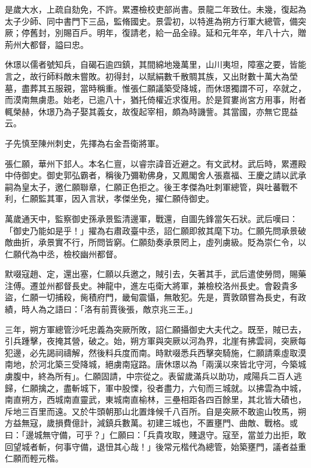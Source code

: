 \begin{pinyinscope}
 是歲大水，上疏自劾免，不許。累遷檢校吏部尚書。景龍二年致仕。未幾，復起為太子少師、同中書門下三品，監脩國史。景雲初，以特進為朔方行軍大總管，備突厥；停舊封，別賜百戶。明年，復請老，給一品全祿。延和元年卒，年八十六，贈荊州大都督，謚曰忠。



 休璟以儒者號知兵，自碣石逾四鎮，其間綿地幾萬里，山川夷坦，障塞之要，皆能言之，故行師料敵未嘗敗。初得封，以賦絹數千散賙其族，又出財數十萬大為塋墓，盡葬其五服親，當時稱重。惟張仁願議築受降城，而休璟獨謂不可，卒就之，而漠南無虜患。始老，已逾八十，猶托倚權近求復用。於是賀婁尚宮方用事，附者輒榮赫，休璟乃為子娶其義女，故復起宰相，頗為時譏訾。其當國，亦無它毘益云。



 子先慎至陳州刺史，先擇為右金吾衛將軍。



 張仁願，華州下邽人。本名仁亶，以睿宗諱音近避之。有文武材。武后時，累遷殿中侍御史。御史郭弘霸者，稱後乃彌勒佛身，又鳳閣舍人張嘉福、王慶之請以武承嗣為皇太子，邀仁願聯章，仁願正色拒之。後王孝傑為吐刺軍總管，與吐蕃戰不利，仁願監其軍，因入言狀，孝傑坐免，擢仁願侍御史。



 萬歲通天中，監察御史孫承景監清邊軍，戰還，自圖先鋒當矢石狀。武后嘆曰：「御史乃能如是乎！」擢為右肅政臺中丞，詔仁願即敘其麾下功。仁願先問承景破敵曲折，承景實不行，所問皆窮。仁願劾奏承景罔上，虛列虜級。貶為崇仁令，以仁願代為中丞，檢校幽州都督。



 默啜寇趙、定，還出塞，仁願以兵邀之，賊引去，矢著其手，武后遣使勞問，賜藥注傅。遷並州都督長史。神龍中，進左屯衛大將軍，兼檢校洛州長史。會穀貴多盜，仁願一切捕殺，胔積府門，畿甸震懾，無敢犯。先是，賈敦頤嘗為長史，有政績，時人為之語曰：「洛有前賈後張，敵京兆三王。」



 三年，朔方軍總管沙吒忠義為突厥所敗，詔仁願攝御史大夫代之。既至，賊已去，引兵踵擊，夜掩其營，破之。始，朔方軍與突厥以河為界，北崖有拂雲祠，突厥每犯邊，必先謁祠禱解，然後料兵度而南。時默啜悉兵西擊突騎施，仁願請乘虛取漠南地，於河北築三受降城，絕虜南寇路。唐休璟以為「兩漢以來皆北守河，今築城虜腹中，終為所有」。仁願固請，中宗從之。表留歲滿兵以助功，咸陽兵二百人逃歸，仁願擒之，盡斬城下，軍中股慄，役者盡力，六旬而三城就。以拂雲為中城，南直朔方，西城南直靈武，東城南直榆林，三壘相距各四百餘里，其北皆大磧也，斥地三百里而遠。又於牛頭朝那山北置烽候千八百所。自是突厥不敢逾山牧馬，朔方益無寇，歲損費億計，減鎮兵數萬。初建三城也，不置壅門、曲敵、戰格。或曰：「邊城無守備，可乎？」仁願曰：「兵貴攻取，賤退守。寇至，當並力出拒，敢回望城者斬，何事守備，退忸其心哉！」後常元楷代為總管，始築壅門，議者益重仁願而輕元楷。




\end{pinyinscope}
